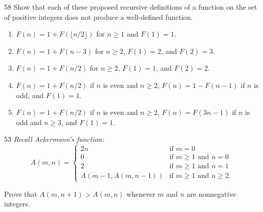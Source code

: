\documentclass[11pt]{article}
\begin{document}
\begin{exercise}{58}
    Show that each of these proposed recursive definitions of a
    function on the set of positive integers does not produce a
    well-defined function.
    \begin{enumerate}[label=(\alph*)]
        \item $F(n) = 1 + F(\lfloor n/2 \rfloor)$ for $n \geq 1$ and
        $F(1) = 1$.
        \item $F(n) = 1 + F(n-3)$ for $n \geq 2$, $F(1) = 2$, and
        $F(2) = 3$.
        \item $F(n) = 1 + F(n/2)$ for $n \geq 2$, $F(1) = 1$, and
        $F(2) = 2$.
        \item $F(n) = 1 + F(n/2)$ if $n$ is even and $n \geq 2$,
        $F(n) = 1 - F(n-1)$ if $n$ is odd, and $F(1) = 1$.
        \item $F(n) = 1 + F(n/2)$ if $n$ is even and $n \geq 2$,
        $F(n) = F(3n-1)$ if $n$ is odd and $n \geq 3$, and
        $F(1) = 1$.
    \end{enumerate}
\end{exercise}

\begin{exercise}{53}
    \textit{Recall Ackermann's function:}
    \[
    A(m,n) =
    \begin{cases}
        2n & \text{if } m = 0 \\
        0 & \text{if } m \geq 1 \text{ and } n = 0 \\
        2 & \text{if } m \geq 1 \text{ and } n = 1 \\
        A(m-1, A(m, n-1)) & \text{if } m \geq 1 \text{ and } n \geq 2.
    \end{cases}
    \]

    Prove that $A(m, n+1) > A(m, n)$ whenever $m$ and $n$ are
    nonnegative integers.
\end{exercise}
\end{document}
